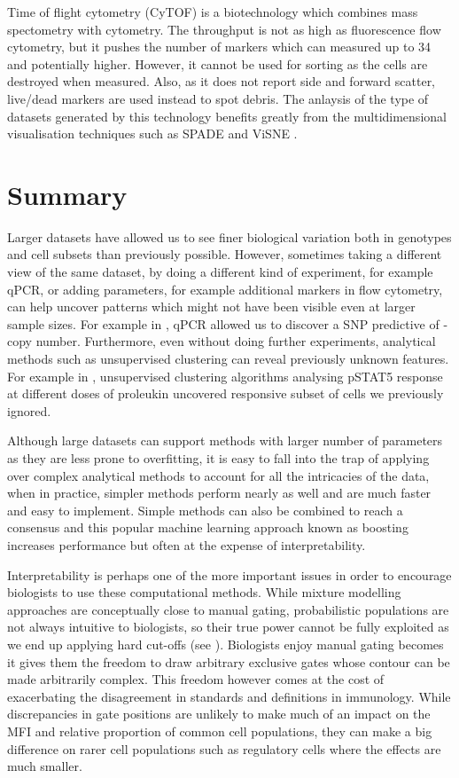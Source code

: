 Time of flight cytometry (CyTOF) is a biotechnology which combines mass spectometry with cytometry.
The throughput is not as high as fluorescence flow cytometry, but it pushes the number of markers which can measured up to 34 and potentially higher.
However, it cannot be used for sorting as the cells are destroyed when measured.
Also, as it does not report side and forward scatter, live/dead markers are used instead to spot debris.
The anlaysis of the type of datasets generated by this technology benefits greatly from the multidimensional visualisation techniques such as \gls{SPADE} \citep{Simonds:2011jh} and ViSNE \citep{Amir:2013jp}.


\section{Summary}

Larger datasets have allowed us to see finer biological variation both in genotypes and cell subsets than previously possible.
However, sometimes taking a different view of the same dataset, by doing a different kind of experiment, for example qPCR, or adding parameters, for example additional markers in flow cytometry, can help uncover patterns which might not have been visible even at larger sample sizes.
For example in , qPCR allowed us to discover a SNP predictive of - copy number.
Furthermore, even without doing further experiments, analytical methods such as unsupervised clustering can reveal previously unknown features.
For example in , unsupervised clustering algorithms analysing pSTAT5 response at different doses of proleukin uncovered responsive subset of cells we previously ignored.

Although large datasets can support methods with larger number of parameters as they are less prone to overfitting,
it is easy to fall into the trap of applying over complex analytical methods to account for all the intricacies of the data,
when in practice, simpler methods perform nearly as well and are much faster and easy to implement.
Simple methods can also be combined to reach a consensus and this popular machine learning approach known as boosting increases performance but often at the expense of interpretability.

Interpretability is perhaps one of the more important issues in order to encourage biologists to use these computational methods.
While mixture modelling approaches are conceptually close to manual gating, probabilistic populations are not always intuitive to biologists,
so their true power cannot be fully exploited as we end up applying hard cut-offs (see ).
Biologists enjoy manual gating becomes it gives them the freedom to draw arbitrary exclusive gates whose contour can be made arbitrarily complex.
This freedom however comes at the cost of exacerbating the disagreement in standards and definitions in immunology.
While discrepancies in gate positions are unlikely to make much of an impact on the MFI and relative proportion of common cell populations,
they can make a big difference on rarer cell populations such as regulatory cells where the effects are much smaller.

